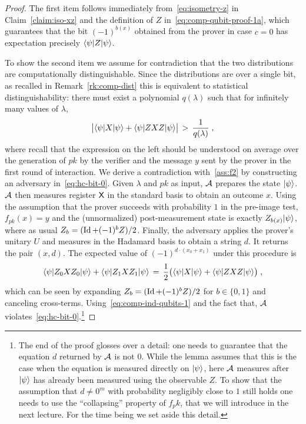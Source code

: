 \begin{proof}
The first item follows immediately from~\eqref{eq:isometry-z} in Claim~\ref{claim:iso-xz} and the definition of $Z$ in~\eqref{eq:comp-qubit-proof-1a}, which guarantees that  the bit $(-1)^{b(x)}$ obtained from the prover in case $c=0$ has expectation precisely $\langle\psi| Z |\psi\rangle$. 

To show the second item we assume for contradiction that the two distributions are computationally distinguishable. Since the distributions are over a single bit, as recalled in Remark~\ref{rk:comp-dist} this is equivalent to statistical distinguishability: there must exist a polynomial $q(\lambda)$ such that for infinitely many values of $\lambda$, 
\begin{equation}\label{eq:comp-ind-qubits-1}
 \big|\langle\psi| X |\psi\rangle +  \langle\psi| ZXZ |\psi\rangle\big| \,>\, \frac{1}{q(\lambda)}\;,
\end{equation}
where recall that the expression on the left should be understood on average over the generation of $pk$ by the verifier and the message $y$ sent by the prover in the first round of interaction. We derive a contradiction with~\ref{ass:f2} by constructing an adversary in~\eqref{eq:hc-bit-0}.  Given $\lambda$ and $pk$ as input, $\mathcal{A}$ prepares the state $|\psi\rangle$. $\mathcal{A}$ then measures register ${\textsf{X}}$ in the standard basis to obtain an outcome $x$. Using the assumption that the prover succeeds with probability $1$ in the pre-image test, $f_{pk}(x)=y$ and the (unnormalized) post-measurement state is exactly $Z_{b(x)}|\psi\rangle$, where as usual $Z_b = (\mathop{\rm Id}\nolimits + (-1)^b Z)/2$.  Finally, the adversary applies the prover's unitary $U$ and measures in the Hadamard basis to obtain a string $d$. It returns the pair $(x,d)$. The expected value of $(-1)^{d\cdot (x_0+x_1)}$ under this procedure is 
\[ \langle\psi| Z_0 X Z_0 |\psi\rangle + \langle\psi| Z_1 X Z_1 |\psi\rangle \,=\,\frac{1}{2}\big(\langle\psi| X |\psi\rangle +  \langle\psi| ZXZ |\psi\rangle\big)\;,\]
which can be seen by expanding $Z_b=(\mathop{\rm Id}\nolimits+(-1)^b Z)/2$ for $b\in \{0,1\}$ and canceling cross-terms. Using~\eqref{eq:comp-ind-qubits-1} and the fact that, $\mathcal{A}$ violates~\eqref{eq:hc-bit-0}.\footnote{The end of the proof glosses over a detail: one needs to guarantee that the equation $d$ returned by $\mathcal{A}$ is not $0$. While the lemma assumes that this is the case when the equation is measured directly on $|\psi\rangle$, here $\mathcal{A}$ measures after $|\psi\rangle$ has already been measured using the observable $Z$. To show that the assumption that $d\neq 0^m$ with probability negligibly close to $1$ still holds one needs to use the ``collapsing'' property of $f_pk$, that we will introduce in the next lecture. For the time being we set aside this detail.}
\end{proof}


